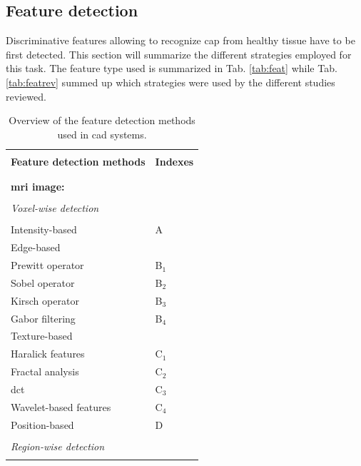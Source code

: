 \subsection{Feature detection} \label{subsec:featuredetection}

Discriminative features allowing to recognize \ac{cap} from healthy tissue have to be first detected. This section will summarize the different strategies employed for this task. The feature type used is summarized in Tab. \ref{tab:feat} while Tab. \ref{tab:featrev} summed up which strategies were used by the different studies reviewed.

\begin{table}
	\caption{Overview of the feature detection methods used in \ac{cad} systems.}
	\small
	\renewcommand{\arraystretch}{.9}
	\begin{tabular}{p{.7\linewidth} >{\centering\arraybackslash}p{.20\linewidth}}
		\hline \\ [-1.5ex]
		\textbf{Feature detection methods} & \textbf{Indexes} \\ \\ [-1.5ex]
		\hline \\ [-1.5ex]
		\textbf{\ac{mri} image:} & \\ \\ [-1.5ex]
		\quad \textit{Voxel-wise detection} &  \\ \\ [-1.5ex]
		\quad \quad Intensity-based & A \\
		\quad \quad Edge-based & \\
		\quad \quad \quad Prewitt operator & B$_1$ \\
		\quad \quad \quad Sobel operator & B$_2$ \\
		\quad \quad \quad Kirsch operator & B$_3$ \\
		\quad \quad \quad Gabor filtering & B$_4$ \\ 
		\quad \quad Texture-based & \\
		\quad \quad \quad Haralick features & C$_1$ \\
		\quad \quad \quad Fractal analysis & C$_2$ \\
		\quad \quad \quad \Ac{dct} & C$_3$ \\
		\quad \quad \quad Wavelet-based features & C$_4$ \\
		\quad \quad Position-based & D \\ \\ [-1.5ex]
		\quad \textit{Region-wise detection} &  \\ \\ [-1.5ex]

\end{tabular}
\end{table}
